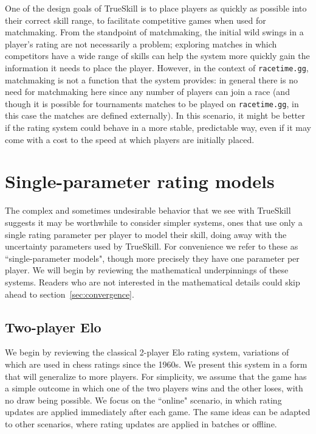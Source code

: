 \documentclass{article}
\begin{document}
	One of the design goals of TrueSkill is to place players as quickly as possible into their correct skill range, to facilitate competitive games when used for matchmaking. From the standpoint of matchmaking, the initial wild swings in a player's rating are not necessarily a problem; exploring matches in which competitors have a wide range of skills can help the system more quickly gain the information it needs to place the player. However, in the context of \texttt{racetime.gg}, matchmaking is not a function that the system provides: in general there is no need for matchmaking here since any number of players can join a race (and though it is possible for tournaments matches to be played on \texttt{racetime.gg}, in this case the matches are defined externally). In this scenario, it might be better if the rating system could behave in a more stable, predictable way, even if it may come with a cost to the speed at which players are initially placed.
	
	\section{Single-parameter rating models}
	The complex and sometimes undesirable behavior that we see with TrueSkill suggests it may be worthwhile to consider simpler systems, ones that use only a single rating parameter per player to model their skill, doing away with the uncertainty parameters used by TrueSkill. For convenience we refer to these as ``single-parameter models", though more precisely they have one parameter per player. We will begin by reviewing the mathematical underpinnings of these systems.
	Readers who are not interested in the mathematical details could skip ahead to section~\ref{sec:convergence}.  
	
	\subsection{Two-player Elo}
	We begin by reviewing the classical 2-player Elo rating system, variations of which are used in chess ratings since the 1960s. We present this system in a form that will generalize to more players. For simplicity, we assume that the game has a simple outcome in which one of the two players wins and the other loses, with no draw being possible. We focus on the ``online" scenario, in which rating updates are applied immediately after each game. The same ideas can be adapted to other scenarios, where rating updates are applied in batches or offline.
	
\end{document}

